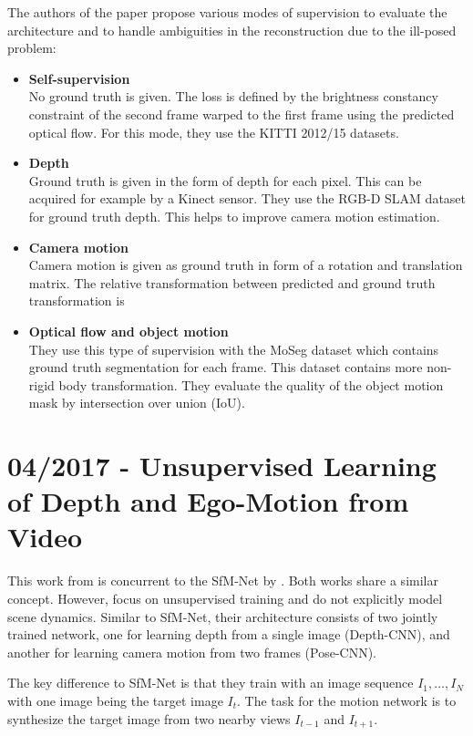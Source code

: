 		The authors of the paper propose various modes of supervision to evaluate the architecture and to handle ambiguities in the reconstruction due to the ill-posed problem:
		\begin{itemize}
		\item \textbf{Self-supervision}
			\\
			No ground truth is given.
			The loss is defined by the brightness constancy constraint of the second frame warped to the first frame using the predicted optical flow.
			For this mode, they use the {KITTI} 2012/15 datasets.
		\item \textbf{Depth}
			\\
			Ground truth is given in the form of depth for each pixel.
			This can be acquired for example by a Kinect sensor.
			They use the {RGB-D SLAM} dataset for ground truth depth.
			This helps to improve camera motion estimation. 
		\item \textbf{Camera motion}
			\\
			Camera motion is given as ground truth in form of a rotation and translation matrix.
			The relative transformation between predicted and ground truth transformation is 
		\item \textbf{Optical flow and object motion}
			\\
			They use this type of supervision with the MoSeg dataset which contains ground truth segmentation for each frame.
			This dataset contains more non-rigid body transformation.
			They evaluate the quality of the object motion mask by intersection over union (IoU).
		\end{itemize}
		
	\section{04/2017 - Unsupervised Learning of Depth and Ego-Motion from Video}
		
		This work from \cite{zhou2017unsupervised} is concurrent to the SfM-Net by \cite{SFMNET}.
		Both works share a similar concept.
		However, \cite{zhou2017unsupervised} focus on unsupervised training and do not explicitly model scene dynamics.
		Similar to SfM-Net, their architecture consists of two jointly trained network, one for learning depth from a single image (Depth-CNN), and another for learning camera motion from two frames (Pose-CNN).
		
		The key difference to SfM-Net is that they train with an image sequence $I_1, \dots, I_N$ with one image being the target image $I_t$.
		The task for the motion network is to synthesize the target image from two nearby views $I_{t - 1}$ and $I_{t + 1}$.
		
